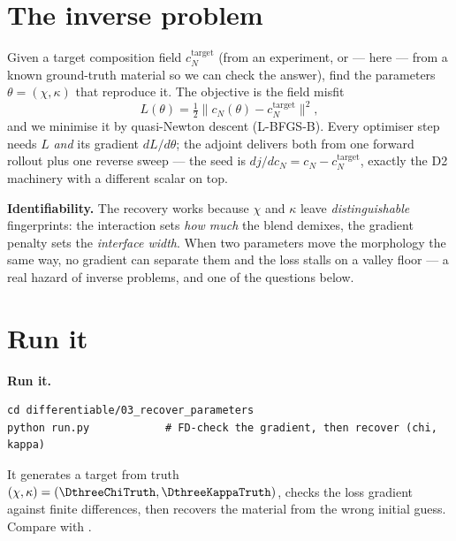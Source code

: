 \section{The inverse problem}

Given a target composition field $c_N^{\text{target}}$ (from an
experiment, or --- here --- from a known ground-truth material so we can
check the answer), find the parameters $\theta=(\chi,\kappa)$ that
reproduce it. The objective is the field misfit
%
\begin{equation}
  L(\theta) = \tfrac12\big\lVert c_N(\theta) - c_N^{\text{target}}\big\rVert^2 ,
  \label{eq:d3L}
\end{equation}
%
and we minimise it by quasi-Newton descent (L-BFGS-B). Every optimiser
step needs $L$ \emph{and} its gradient $dL/d\theta$; the adjoint delivers
both from one forward rollout plus one reverse sweep --- the seed is
$dj/dc_N = c_N-c_N^{\text{target}}$, exactly the D2 machinery with a
different scalar on top.

\begin{keybox}
\textbf{Identifiability.} The recovery works because $\chi$ and $\kappa$
leave \emph{distinguishable} fingerprints: the interaction sets \emph{how
much} the blend demixes, the gradient penalty sets the \emph{interface
width}. When two parameters move the morphology the same way, no gradient
can separate them and the loss stalls on a valley floor --- a real hazard
of inverse problems, and one of the questions below.
\end{keybox}

\section{Run it}

\begin{runbox}
\textbf{Run it.}
\begin{lstlisting}
cd differentiable/03_recover_parameters
python run.py            # FD-check the gradient, then recover (chi, kappa)
\end{lstlisting}
It generates a target from truth $(\chi,\kappa)=(\DthreeChiTruth,
\DthreeKappaTruth)$, checks the loss gradient against finite differences,
then recovers the material from the wrong initial guess. Compare with
.
\end{runbox}

